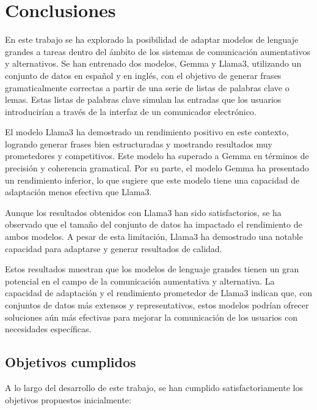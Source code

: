 \documentclass[11pt,spanish,listoffigures,listoftables]{tfgetsinf}
\begin{document}

\chapter{Conclusiones} \label{cap6}

En este trabajo se ha explorado la posibilidad de adaptar modelos de lenguaje grandes a tareas dentro del ámbito de los sistemas de comunicación aumentativos y alternativos. Se han entrenado dos modelos, Gemma y Llama3, utilizando un conjunto de datos en español y en inglés, con el objetivo de generar frases gramaticalmente correctas a partir de una serie de listas de palabras clave o lemas. Estas listas de palabras clave simulan las entradas que los usuarios introducirían a través de la interfaz de un comunicador electrónico.

El modelo Llama3 ha demostrado un rendimiento positivo en este contexto, logrando generar frases bien estructuradas y mostrando resultados muy prometedores y competitivos. Este modelo ha superado a Gemma en términos de precisión y coherencia gramatical. Por su parte, el modelo Gemma ha presentado un rendimiento inferior, lo que sugiere que este modelo tiene una capacidad de adaptación menos efectiva que Llama3.

Aunque los resultados obtenidos con Llama3 han sido satisfactorios, se ha observado que el tamaño del conjunto de datos ha impactado el rendimiento de ambos modelos. A pesar de esta limitación, Llama3 ha demostrado una notable capacidad para adaptarse y generar resultados de calidad.

Estos resultados muestran que los modelos de lenguaje grandes tienen un gran potencial en el campo de la comunicación aumentativa y alternativa. La capacidad de adaptación y el rendimiento prometedor de Llama3 indican que, con conjuntos de datos más extensos y representativos, estos modelos podrían ofrecer soluciones aún más efectivas para mejorar la comunicación de los usuarios con necesidades específicas.

\section{Objetivos cumplidos}

A lo largo del desarrollo de este trabajo, se han cumplido satisfactoriamente los objetivos propuestos inicialmente:
\end{document}
